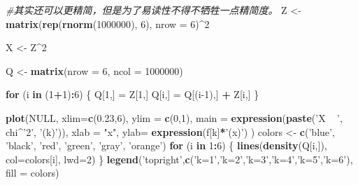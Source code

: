 \documentclass[]{book}
\newenvironment{Shaded}{\begin{snugshade}}{\end{snugshade}}
\newcommand{\CommentTok}[1]{\textcolor[rgb]{0.56,0.35,0.01}{\textit{#1}}}
\newcommand{\ControlFlowTok}[1]{\textcolor[rgb]{0.13,0.29,0.53}{\textbf{#1}}}
\newcommand{\DataTypeTok}[1]{\textcolor[rgb]{0.13,0.29,0.53}{#1}}
\newcommand{\DecValTok}[1]{\textcolor[rgb]{0.00,0.00,0.81}{#1}}
\newcommand{\FloatTok}[1]{\textcolor[rgb]{0.00,0.00,0.81}{#1}}
\newcommand{\KeywordTok}[1]{\textcolor[rgb]{0.13,0.29,0.53}{\textbf{#1}}}
\newcommand{\NormalTok}[1]{#1}
\newcommand{\OperatorTok}[1]{\textcolor[rgb]{0.81,0.36,0.00}{\textbf{#1}}}
\newcommand{\OtherTok}[1]{\textcolor[rgb]{0.56,0.35,0.01}{#1}}
\newcommand{\StringTok}[1]{\textcolor[rgb]{0.31,0.60,0.02}{#1}}
\begin{document}
\begin{Shaded}
\begin{Highlighting}[]
\CommentTok{#其实还可以更精简，但是为了易读性不得不牺牲一点精简度。}
\NormalTok{Z <-}\StringTok{ }\KeywordTok{matrix}\NormalTok{(}\KeywordTok{rep}\NormalTok{(}\KeywordTok{rnorm}\NormalTok{(}\DecValTok{1000000}\NormalTok{), }\DecValTok{6}\NormalTok{), }\DataTypeTok{nrow =} \DecValTok{6}\NormalTok{)}\OperatorTok{^}\DecValTok{2}

\NormalTok{X <-}\StringTok{ }\NormalTok{Z}\OperatorTok{^}\DecValTok{2}

\NormalTok{Q <-}\StringTok{ }\KeywordTok{matrix}\NormalTok{(}\DataTypeTok{nrow =} \DecValTok{6}\NormalTok{, }\DataTypeTok{ncol =} \DecValTok{1000000}\NormalTok{)}

\ControlFlowTok{for}\NormalTok{ (i }\ControlFlowTok{in}\NormalTok{ (}\DecValTok{1}\OperatorTok{+}\DecValTok{1}\NormalTok{)}\OperatorTok{:}\DecValTok{6}\NormalTok{) \{}
\NormalTok{  Q[}\DecValTok{1}\NormalTok{,] =}\StringTok{ }\NormalTok{Z[}\DecValTok{1}\NormalTok{,]}
\NormalTok{  Q[i,] =}\StringTok{ }\NormalTok{Q[(i}\DecValTok{-1}\NormalTok{),] }\OperatorTok{+}\StringTok{ }\NormalTok{Z[i,]}
\NormalTok{\}}

\KeywordTok{plot}\NormalTok{(}\OtherTok{NULL}\NormalTok{, }\DataTypeTok{xlim=}\KeywordTok{c}\NormalTok{(}\FloatTok{0.23}\NormalTok{,}\DecValTok{6}\NormalTok{), }\DataTypeTok{ylim =} \KeywordTok{c}\NormalTok{(}\DecValTok{0}\NormalTok{,}\DecValTok{1}\NormalTok{),}
     \DataTypeTok{main =} \KeywordTok{expression}\NormalTok{(}\KeywordTok{paste}\NormalTok{(}\StringTok{'X ~ '}\NormalTok{, chi}\OperatorTok{^}\StringTok{'2'}\NormalTok{, }\StringTok{'(k)'}\NormalTok{)), }
     \DataTypeTok{xlab =} \StringTok{"x"}\NormalTok{, }
     \DataTypeTok{ylab=} \KeywordTok{expression}\NormalTok{(f[k]}\OperatorTok{*}\StringTok{'(x)'}\NormalTok{)}
\NormalTok{    )}
\NormalTok{colors <-}\StringTok{ }\KeywordTok{c}\NormalTok{(}\StringTok{'blue'}\NormalTok{, }\StringTok{'black'}\NormalTok{, }\StringTok{'red'}\NormalTok{, }\StringTok{'green'}\NormalTok{, }\StringTok{'gray'}\NormalTok{, }\StringTok{'orange'}\NormalTok{)}
\ControlFlowTok{for}\NormalTok{ (i }\ControlFlowTok{in} \DecValTok{1}\OperatorTok{:}\DecValTok{6}\NormalTok{) \{}
  \KeywordTok{lines}\NormalTok{(}\KeywordTok{density}\NormalTok{(Q[i,]),}
        \DataTypeTok{col=}\NormalTok{colors[i],}
        \DataTypeTok{lwd=}\DecValTok{2}\NormalTok{)}
\NormalTok{\}}
\KeywordTok{legend}\NormalTok{(}\StringTok{'topright'}\NormalTok{,}\KeywordTok{c}\NormalTok{(}\StringTok{'k=1'}\NormalTok{,}\StringTok{'k=2'}\NormalTok{,}\StringTok{'k=3'}\NormalTok{,}\StringTok{'k=4'}\NormalTok{,}\StringTok{'k=5'}\NormalTok{,}\StringTok{'k=6'}\NormalTok{),}
       \DataTypeTok{fill =}\NormalTok{ colors)}
\end{Highlighting}
\end{Shaded}
\end{document}
